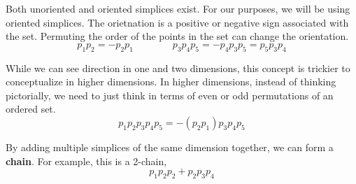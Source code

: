 Both unoriented and oriented simplices exist.  For our purposes, we will be using oriented simplices.  The orietnation is a positive or negative sign associated with the set.  Permuting the order of the points in the set can change the orientation.
\begin{equation}
  p_1 p_2 = - p_2 p_1 \qquad \qquad p_3 p_4 p_5 = - p_4 p_3 p_5 = p_5 p_3 p_4
\end{equation}
\begin{center}
\end{center}
While we can see direction in one and two dimensions, this concept is trickier to conceptualize in higher dimensions.  In higher dimensions, instead of thinking pictorially, we need to just think in terms of even or odd permutations of an ordered set.
\begin{equation}
  p_1 p_2 p_3 p_4 p_5 = - (p_2 p_1) p_3 p_4 p_5
\end{equation}

By adding multiple simplices of the same dimension together, we can form a \textbf{chain}.  For example, this is a 2-chain,
\begin{equation}
  p_1 p_2 p_2 + p_2 p_3 p_4
\end{equation}
\begin{center}
\end{center}

